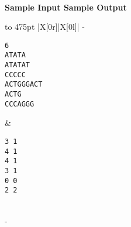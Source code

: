\documentclass[a4paper,11pt]{article}
\begin{document}
\vspace{10mm}\\
\bf{Sample Input} \hspace{52mm} \bf{Sample Output}\vspace{1mm}\\
\begin{tabu*} to 475pt {|X[0r]|X[0l]|}
\tabucline-
\vspace{-\baselineskip} %
\begin{Verbatim}
6
ATATA
ATATAT
CCCCC
ACTGGGACT
ACTG
CCCAGGG
\end{Verbatim}
&
\vspace{-\baselineskip} %
\begin{Verbatim}
3 1
4 1
4 1
3 1
0 0
2 2
\end{Verbatim}
\\
\tabucline-
\end{tabu*}
\end{document}
